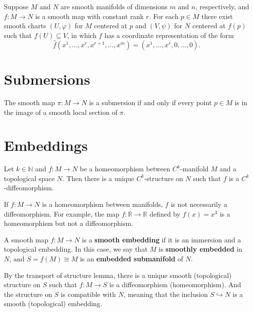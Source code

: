 \documentclass[12pt, oneside]{book}
\begin{document}
\section{}
\begin{theorem}
    Suppose $M$ and $N$ are smooth manifolds of dimensions $m$ and $n$, respectively, and
    $f : M \to N$
    is a smooth map with constant rank $r$. For each $p \in M$ there exist smooth charts
    $(U,\varphi)$
    for $M$ centered at $p$ and
    $(V,\psi)$
    for $N$ centered at $f(p)$ such that $f(U)\subseteq V$, in which $f$ has a coordinate representation of the form
    \[
        \hat{f}(x^1,\ldots,x^r,x^{r+1},\ldots,x^m)
        =
        (x^1,\ldots,x^r,0,\ldots,0).
    \]
\end{theorem}




\section{Submersions}


\begin{theorem}
    The smooth map $\pi : M \to N$ is a submersion if and only if every point $p\in M$ is in the image of a smooth local section of $\pi$.
\end{theorem}





\section{Embeddings}

\begin{lemma}
    Let $k\in \mathbb{N}$ and $f:M\to N$ be a homeomorphism between $C^k$-manifold $M$ and a topological space $N$.
    Then there is a unique $C^k$-structure on $N$ such that $f$ is a $C^k$-diffeomorphism.
    \begin{remark}
        If $f:M\to N$ is a homeomorphism between manifolds, $f$ is not necessarily a diffeomorphism. For example, the map $f:\mathbb{R}\to\mathbb{R}$ defined by $f(x)=x^3$ is a homeomorphism but not a diffeomorphism.
    \end{remark}
\end{lemma}

\begin{definition}
    A smooth map $f:M\rightarrow N$ is a \textbf{smooth embedding} if it is an immersion and a topological embedding. In this case, we say that $M$ is \textbf{smoothly embedded} in $N$, and $S=f(M) \cong M $ is an \textbf{embedded submanifold} of $N$.
\end{definition}
\begin{remark}
    By the transport of structure lemma, there is a unique smooth (topological) structure on $S$ such that $f:M\to S$ is a diffeomorphism (homeomorphism).
    And the structure on $S$ is compatible with $N$, meaning that the inclusion $S\hookrightarrow N$ is a smooth (topological) embedding.
\end{remark}
\end{document}
